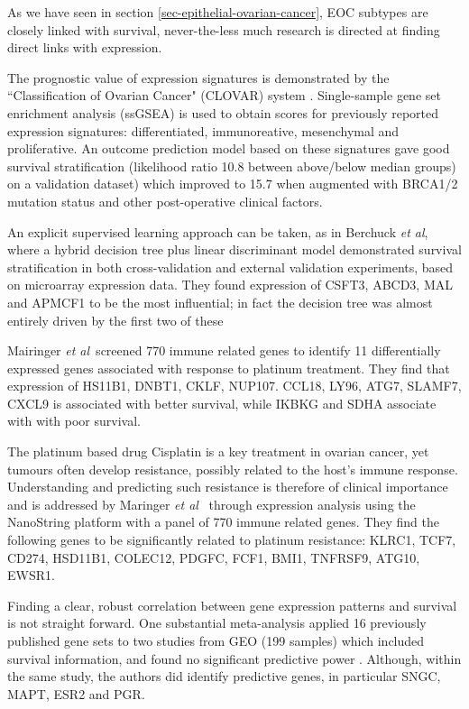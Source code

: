 \documentclass[draft, tikz, 12pt,a4paper,oneside,fleqn]{article}
\newcommand{\etal}{{\em et al\/}}
\begin{document}
As we have seen in section \ref{sec-epithelial-ovarian-cancer}, EOC subtypes are closely linked with survival, never-the-less much research is directed at finding direct links with expression.

The prognostic value of expression signatures is demonstrated by the ``Classification of Ovarian Cancer" (CLOVAR) system \cite{Verhaak2013}.  
Single-sample gene set enrichment analysis (ssGSEA) is used to obtain scores for previously reported expression signatures: differentiated, immunoreative, mesenchymal and proliferative.  
An outcome prediction model based on these signatures gave good survival stratification (likelihood ratio 10.8 between above/below median groups) on a validation dataset) which improved to 15.7 when augmented with BRCA1/2 mutation status and other post-operative clinical factors.

An explicit supervised learning approach can be taken, as in Berchuck \etal, where a hybrid decision tree plus linear discriminant model demonstrated survival stratification in both cross-validation and external validation experiments, based on microarray expression data.   
They found expression of CSFT3, ABCD3, MAL and APMCF1 to be the most influential; in fact the decision tree was almost entirely driven by the first two of these

Mairinger \etal\ screened 770 immune related genes to identify 11 differentially expressed genes associated with response to platinum treatment.  
They find that expression of HS11B1, DNBT1, CKLF, NUP107. CCL18, LY96, ATG7, SLAMF7, CXCL9 is associated with better survival, while IKBKG and SDHA associate with with poor survival.

The platinum based drug Cisplatin is a key treatment in ovarian cancer, yet tumours often develop resistance, possibly related to the host's immune response.  
Understanding and predicting such resistance is therefore of clinical importance and is addressed by Maringer \etal\ \cite{Mairinger2019} through expression analysis using the NanoString platform with a panel of 770 immune related genes.   
They find the following genes to be significantly related to platinum resistance: KLRC1, TCF7, CD274, HSD11B1, COLEC12, PDGFC, FCF1, BMI1, TNFRSF9, ATG10, EWSR1.

Finding a clear, robust correlation between gene expression patterns and survival is not straight forward.  
One substantial meta-analysis applied 16 previously published gene sets to two studies from GEO (199 samples) which included survival information, and found no significant predictive power \cite{Fekete2012a}.  
Although, within the same study, the authors did identify predictive genes, in particular SNGC, MAPT, ESR2 and PGR.
\end{document}

